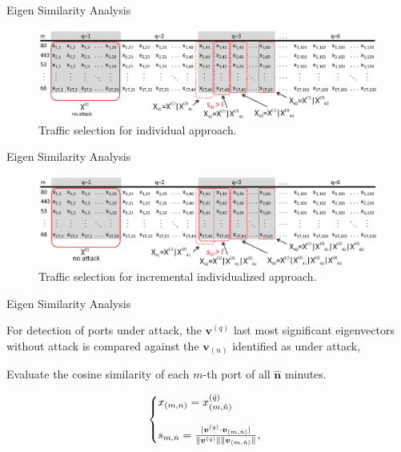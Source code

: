 \documentclass[newPxFont, numfooter, sectionpages]{beamer}
\DeclarePairedDelimiter\abs{\lvert}{\rvert}%
\DeclarePairedDelimiter\norm{\lVert}{\rVert}%
\begin{document}
\begin{frame}{Eigen Similarity Analysis}
	
	\begin{figure}[h!]
	     \includegraphics[width=11.5cm]{../figures/individualized.eps}
	     \caption{Traffic selection for individual approach.}
	     \label{fig:2_fig9}
	\end{figure}
\end{frame}
\begin{frame}{Eigen Similarity Analysis}
	
	\begin{figure}[h!]
	     \includegraphics[width=11.5cm]{../figures/incremental_individualized.eps}
	     \caption{Traffic selection for incremental individualized approach.}
	     \label{fig:2_fig2}
	\end{figure}

\end{frame}
\begin{frame}{Eigen Similarity Analysis}
	
	For detection of ports under attack, the $\boldsymbol{v}^{(q)}$ last most significant eigenvectors without attack is compared against the $\boldsymbol{v}_{(n)}$ identified as under attack, 

	Evaluate the cosine similarity of each $m$-th port of all $\boldsymbol{\hat{n}}$ minutes.

	\begin{equation}\label{eq:eq15}
		\left\{
		\begin{array}{@{}ll@{}}
			x_{(m,n)} = x^{(\hat{q})}_{(m,\hat{n})} \\
			\\
			s_{m,\hat{n}} = \frac{\abs{\boldsymbol{v}^{(q)} \cdot \boldsymbol{v}_{(m,\hat{n})}}}{\norm{\boldsymbol{v}^{(q)}}\norm{\boldsymbol{v}_{(m,\hat{n})}}},
		\end{array}\right.
	\end{equation}

\end{frame}
\end{document}
